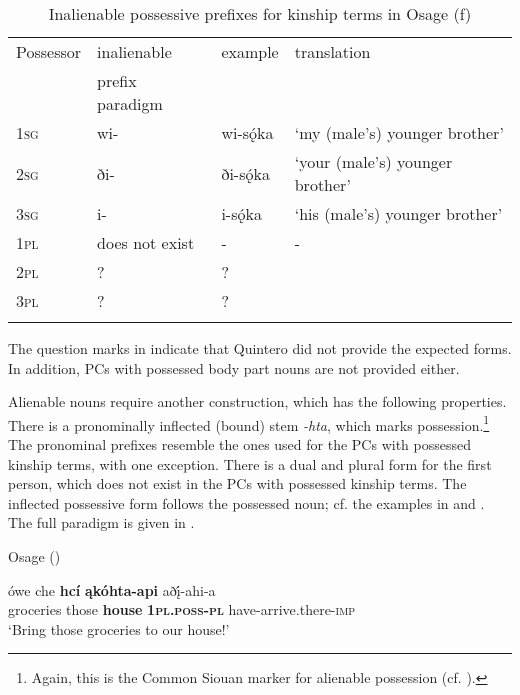 \documentclass[output=paper]{LSP/langsci}
\begin{document}
\begin{table}
\caption{Inalienable possessive prefixes for kinship terms in Osage (\citealt[481]{Quintero2004}f)} \label{osageinalienable}
\begin{tabular}{ l l l l }
\lsptoprule
Possessor	 & inalienable & example & translation \\
& prefix paradigm & & \\
\midrule
\textsc{1sg} & wi-	& wi-sǫ́ka & `my (male's) younger brother' \\
 
\textsc{2sg} & ði- & ði-sǫ́ka & `your (male's) younger brother' \\
 
\textsc{3sg} & i- & i-sǫ́ka & `his (male's) younger brother' \\
 
\textsc{1pl} & does not exist &	- & - \\
 
\textsc{2pl} & ? & ? & \\
 
\textsc{3pl} & ? & ? & \\
\lspbottomrule
\end{tabular}
\end{table}
 
The question marks in  indicate that Quintero did not provide the expected forms. In addition, PCs with possessed body part nouns are not provided either.

Alienable nouns require another construction, which has the following properties. There is a pronominally inflected (bound) stem \textit{-hta}, which marks possession.\footnote{Again, this is the Common Siouan marker for alienable possession (cf. \citealt{RankinEtAl2015AccessMay}).} The pronominal prefixes resemble the ones used for the PCs with possessed kinship terms, with one exception. There is a dual and plural form for the first person, which does not exist in the PCs with possessed kinship terms. The inflected possessive form follows the possessed noun; cf. the examples in  and . The full paradigm is given in .

\ea	Osage (\citealt[298]{Quintero2004}) \label{osagegroceries}

\gll ówe  che    \textbf{hc\'i} \textbf{ \k{a}kóhta-api}  aðį́-ahi-a \\
groceries  those \textbf{house} \textbf{\textsc{1pl.poss-pl}}   have-arrive.there-\textsc{imp} \\
\glt `Bring those groceries to our house!'
\end{document}
